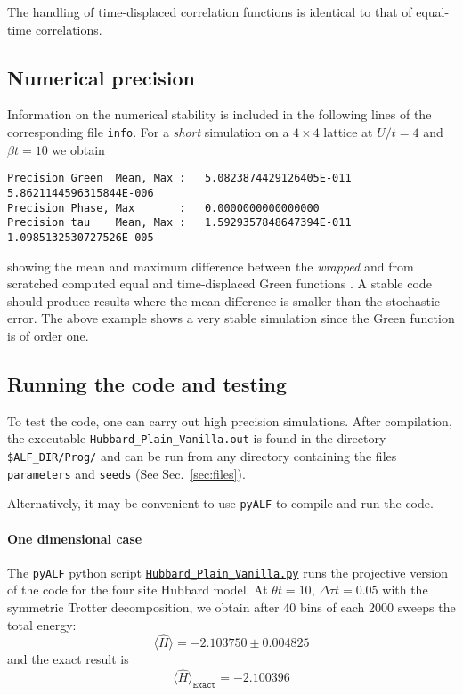 The handling of time-displaced correlation functions is identical to that of equal-time correlations. 

\subsection{Numerical precision}\label{sec:prec_spin}

Information on the numerical stability is included in the following lines of the corresponding file \texttt{info}. 
For a  \textit{short} simulation on a $4 \times 4$  lattice at $U/t=4$ and $\beta t = 10$  we obtain
\begin{lstlisting}[basicstyle=\ttfamily\small,columns=fullflexible,keepspaces=true]
Precision Green  Mean, Max :   5.0823874429126405E-011  5.8621144596315844E-006
Precision Phase, Max       :   0.0000000000000000    
Precision tau    Mean, Max :   1.5929357848647394E-011  1.0985132530727526E-005 
\end{lstlisting}
showing the mean and maximum difference between the \textit{wrapped}  and from scratched computed equal and time-displaced  Green functions \cite{Assaad08_rev}.
A stable code  should produce results where the mean difference is smaller than the  stochastic error. The above example  shows a very stable simulation since the Green function  is of order one. 

\subsection{Running the code and testing}

To test the code, one can carry out high precision simulations. After compilation, the executable \texttt{Hubbard\_Plain\_Vanilla.out} is found in the directory \texttt{\$ALF\_DIR/Prog/} and can be run from any directory containing the files \texttt{parameters} and \texttt{seeds} (See Sec.~\ref{sec:files}).

Alternatively, it may be convenient to use \texttt{pyALF} to compile and run the code.  

\paragraph*{One dimensional case} 

The \texttt{pyALF} python script   \href{https://git.physik.uni-wuerzburg.de/ALF/pyALF/-/blob/master/Scripts/Hubbard_Plain_Vanilla.py}{\texttt{Hubbard\_Plain\_Vanilla.py}}   runs the projective version of the code for the four site Hubbard model.   At $\theta t =10$, $\Delta \tau t = 0.05 $ with the symmetric Trotter  decomposition,  we obtain  after  40 bins of each 2000 sweeps  the  total energy:   
\begin{equation*}
       \langle  \hat{H}   \rangle = -2.103750  \pm      0.004825  
 \end{equation*}
and the exact result is  
\begin{equation*}
\langle  \hat{H}   \rangle_{\texttt{Exact}}    = -2.100396
\end{equation*}

